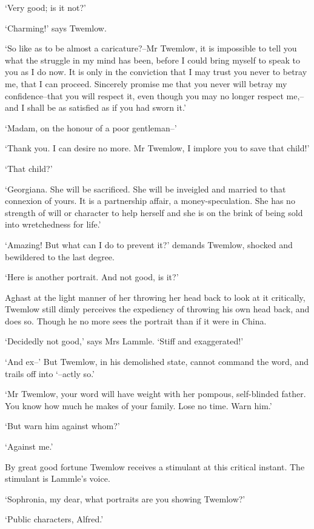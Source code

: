 ‘Very good; is it not?’

‘Charming!’ says Twemlow.

‘So like as to be almost a caricature?--Mr Twemlow, it is impossible
to tell you what the struggle in my mind has been, before I could bring
myself to speak to you as I do now. It is only in the conviction that I
may trust you never to betray me, that I can proceed. Sincerely promise
me that you never will betray my confidence--that you will respect it,
even though you may no longer respect me,--and I shall be as satisfied
as if you had sworn it.’

‘Madam, on the honour of a poor gentleman--’

‘Thank you. I can desire no more. Mr Twemlow, I implore you to save that
child!’

‘That child?’

‘Georgiana. She will be sacrificed. She will be inveigled and married
to that connexion of yours. It is a partnership affair, a
money-speculation. She has no strength of will or character to help
herself and she is on the brink of being sold into wretchedness for
life.’

‘Amazing! But what can I do to prevent it?’ demands Twemlow, shocked and
bewildered to the last degree.

‘Here is another portrait. And not good, is it?’

Aghast at the light manner of her throwing her head back to look at it
critically, Twemlow still dimly perceives the expediency of throwing his
own head back, and does so. Though he no more sees the portrait than if
it were in China.

‘Decidedly not good,’ says Mrs Lammle. ‘Stiff and exaggerated!’

‘And ex--’ But Twemlow, in his demolished state, cannot command the
word, and trails off into ‘--actly so.’

‘Mr Twemlow, your word will have weight with her pompous, self-blinded
father. You know how much he makes of your family. Lose no time. Warn
him.’

‘But warn him against whom?’

‘Against me.’

By great good fortune Twemlow receives a stimulant at this critical
instant. The stimulant is Lammle’s voice.

‘Sophronia, my dear, what portraits are you showing Twemlow?’

‘Public characters, Alfred.’

